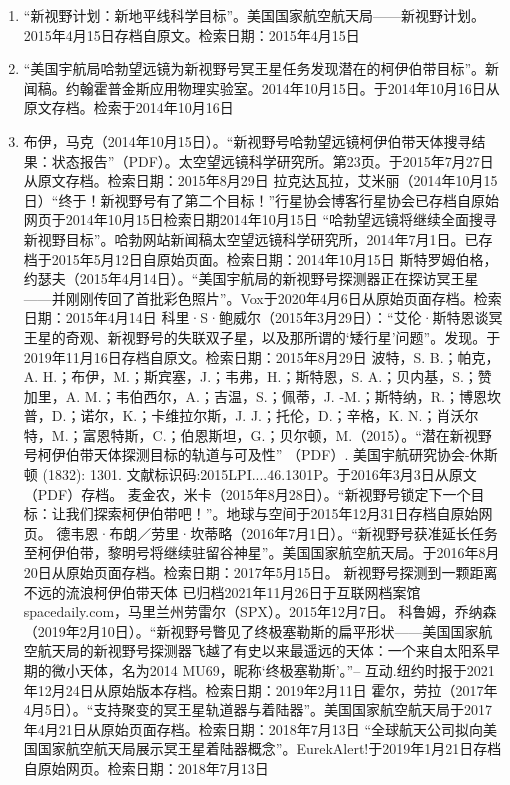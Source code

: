 \begin{enumerate}
\item “新视野计划：新地平线科学目标”。美国国家航空航天局——新视野计划。2015年4月15日存档自原文。检索日期：2015年4月15日
\item “美国宇航局哈勃望远镜为新视野号冥王星任务发现潜在的柯伊伯带目标”。新闻稿。约翰霍普金斯应用物理实验室。2014年10月15日。于2014年10月16日从原文存档。检索于2014年10月16日
\item 布伊，马克（2014年10月15日）。“新视野号哈勃望远镜柯伊伯带天体搜寻结果：状态报告”（PDF）。太空望远镜科学研究所。第23页。于2015年7月27日从原文存档。检索日期：2015年8月29日
 拉克达瓦拉，艾米丽（2014年10月15日）“终于！新视野号有了第二个目标！”行星协会博客行星协会已存档自原始网页于2014年10月15日检索日期2014年10月15日
 “哈勃望远镜将继续全面搜寻新视野目标”。哈勃网站新闻稿太空望远镜科学研究所，2014年7月1日。已存档于2015年5月12日自原始页面。检索日期：2014年10月15日
 斯特罗姆伯格，约瑟夫（2015年4月14日）。“美国宇航局的新视野号探测器正在探访冥王星——并刚刚传回了首批彩色照片”。Vox于2020年4月6日从原始页面存档。检索日期：2015年4月14日
 科里·S·鲍威尔（2015年3月29日）：“艾伦·斯特恩谈冥王星的奇观、新视野号的失联双子星，以及那所谓的‘矮行星’问题”。发现。于2019年11月16日存档自原文。检索日期：2015年8月29日
 波特，S. B.；帕克，A. H.；布伊，M.；斯宾塞，J.；韦弗，H.；斯特恩，S. A.；贝内基，S.；赞加里，A. M.；韦伯西尔，A.；吉温，S.；佩蒂，J. -M.；斯特纳，R.；博恩坎普，D.；诺尔，K.；卡维拉尔斯，J. J.；托伦，D.；辛格，K. N.；肖沃尔特，M.；富恩特斯，C.；伯恩斯坦，G.；贝尔顿，M.（2015）。“潜在新视野号柯伊伯带天体探测目标的轨道与可及性” （PDF）. 美国宇航研究协会-休斯顿 (1832): 1301. 文献标识码:2015LPI....46.1301P。于2016年3月3日从原文 （PDF）存档。
 麦金农，米卡（2015年8月28日）。“新视野号锁定下一个目标：让我们探索柯伊伯带吧！”。地球与空间于2015年12月31日存档自原始网页。
 德韦恩·布朗／劳里·坎蒂略（2016年7月1日）。“新视野号获准延长任务至柯伊伯带，黎明号将继续驻留谷神星”。美国国家航空航天局。于2016年8月20日从原始页面存档。检索日期：2017年5月15日。
 新视野号探测到一颗距离不远的流浪柯伊伯带天体 已归档2021年11月26日于互联网档案馆spacedaily.com，马里兰州劳雷尔（SPX）。2015年12月7日。
 科鲁姆，乔纳森（2019年2月10日）。“新视野号瞥见了终极塞勒斯的扁平形状——美国国家航空航天局的新视野号探测器飞越了有史以来最遥远的天体：一个来自太阳系早期的微小天体，名为2014 MU69，昵称‘终极塞勒斯’。”– 互动.纽约时报于2021年12月24日从原始版本存档。检索日期：2019年2月11日
 霍尔，劳拉（2017年4月5日）。“支持聚变的冥王星轨道器与着陆器”。美国国家航空航天局于2017年4月21日从原始页面存档。检索日期：2018年7月13日
 “全球航天公司拟向美国国家航空航天局展示冥王星着陆器概念”。EurekAlert!于2019年1月21日存档自原始网页。检索日期：2018年7月13日

\end{enumerate}
